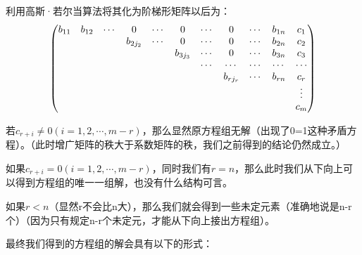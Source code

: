 \documentclass[a4paper]{ctexart}
\begin{document}
利用高斯·若尔当算法将其化为阶梯形矩阵以后为：
$$
\setcounter{MaxMatrixCols}{20}
\begin{pmatrix}
b_{11}&b_{12}&\cdots&0&\cdots&0&\cdots&0&\cdots&b_{1n}&c_{1}\\
&&&b_{2j_{2}}&\cdots&0&\cdots&0&\cdots&b_{2n}&c_{2}\\
&&&&&b_{3j_{3}}&\cdots&0&\cdots&b_{3n}&c_{3}\\
&&&&&&\cdots&\cdots&\cdots&\cdots&\cdots\\
&&&&&&&b_{rj_{r}}&\cdots&b_{rn}&c_{r}\\
&&&&&&&&&&\vdots\\
&&&&&&&&&&c_{m}\\
\end{pmatrix}
$$

若$c_{r+i}\neq 0 (i=1,2,\cdots,m-r)$，那么显然原方程组无解（出现了0=1这种矛盾方程）。（此时增广矩阵的秩大于系数矩阵的秩，我们之前得到的结论仍然成立。）

如果$c_{r+i}= 0 (i=1,2,\cdots,m-r)$，同时我们有$r=n$，那么此时我们从下向上可以得到方程组的唯一一组解，也没有什么结构可言。

如果$r<n$（显然r不会比n大），那么我们就会得到一些未定元素（准确地说是n-r个）（因为只有规定n-r个未定元，才能从下向上接出方程组）。

最终我们得到的方程组的解会具有以下的形式：
\end{document}
